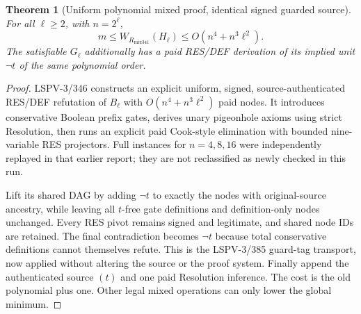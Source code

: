 \documentclass[11pt]{article}
\newtheorem{theorem}{Theorem}
\begin{document}
\begin{theorem}[Uniform polynomial mixed proof, identical signed guarded source]
For all $\ell\ge2$, with $n=2^\ell$,
\[
\boxed{m\le W_{R_{\mathrm{mix341}}}(H_\ell)
\le O(n^4+n^3\ell^2).}
\]
The satisfiable $G_\ell$ additionally has a paid RES/DEF derivation of its implied unit $\neg t$ of the same polynomial order.
\end{theorem}
\begin{proof}
LSPV-3/346 constructs an explicit uniform, signed, source-authenticated RES/DEF refutation of $B_\ell$ with $O(n^4+n^3\ell^2)$ paid nodes. It introduces conservative Boolean prefix gates, derives unary pigeonhole axioms using strict Resolution, then runs an explicit paid Cook-style elimination with bounded nine-variable RES projectors. Full instances for $n=4,8,16$ were independently replayed in that earlier report; they are not reclassified as newly checked in this run.

Lift its shared DAG by adding $\neg t$ to exactly the nodes with original-source ancestry, while leaving all $t$-free gate definitions and definition-only nodes unchanged. Every RES pivot remains signed and legitimate, and shared node IDs are retained. The final contradiction becomes $\neg t$ because total conservative definitions cannot themselves refute. This is the LSPV-3/385 guard-tag transport, now applied without altering the source or the proof system. Finally append the authenticated source $(t)$ and one paid Resolution inference. The cost is the old polynomial plus one. Other legal mixed operations can only lower the global minimum.
\end{proof}
\end{document}
